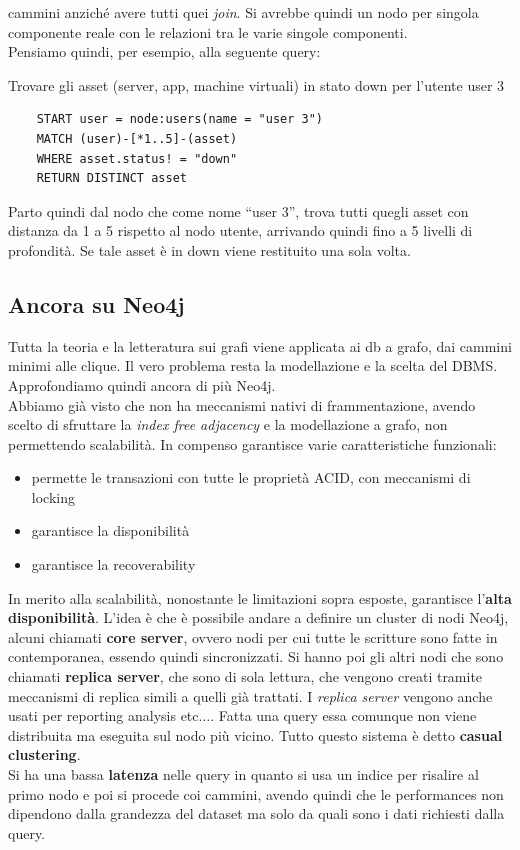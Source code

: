 \documentclass[a4paper,12pt, oneside]{book}
\begin{document}
\begin{esempio}
  cammini anziché avere tutti quei \textit{join}. Si avrebbe quindi un nodo per
  singola componente reale con le relazioni tra le varie singole componenti. \\
  Pensiamo quindi, per esempio, alla seguente query:
  \begin{center}
    Trovare gli asset (server, app, machine virtuali) in stato down per l’utente
    user 3
  \end{center}
  \begin{verbatim}
    START user = node:users(name = "user 3")
    MATCH (user)-[*1..5]-(asset)
    WHERE asset.status! = "down"
    RETURN DISTINCT asset
  \end{verbatim}
  Parto quindi dal nodo che come nome ``user 3'', trova tutti quegli asset con
  distanza da 1 a 5 rispetto al nodo utente, arrivando quindi fino a 5 livelli
  di profondità. Se tale asset è in down viene restituito una sola volta.
\end{esempio}
\subsection{Ancora su Neo4j}
Tutta la teoria e la letteratura sui grafi viene applicata ai db a grafo, dai
cammini minimi alle clique. Il vero problema resta la modellazione e la scelta
del DBMS. Approfondiamo quindi ancora di più Neo4j.\\
Abbiamo già visto che non ha meccanismi nativi di frammentazione, avendo scelto
di sfruttare la \textit{index free adjacency} e la modellazione a grafo, non
permettendo scalabilità. In compenso garantisce varie caratteristiche
funzionali:
\begin{itemize}
  \item permette le transazioni con tutte le proprietà ACID, con meccanismi di
  locking
  \item garantisce la disponibilità
  \item garantisce la recoverability
\end{itemize}
In merito alla scalabilità, nonostante le limitazioni sopra esposte,
garantisce l'\textbf{alta disponibilità}. L'idea è che è possibile andare a
definire un cluster di nodi Neo4j, alcuni chiamati \textbf{core server}, ovvero
nodi per cui tutte le scritture sono fatte in contemporanea, essendo quindi
sincronizzati. Si hanno poi gli altri nodi che sono chiamati \textbf{replica
  server}, che sono di sola lettura, che vengono creati tramite meccanismi di
replica simili a quelli già trattati. I \textit{replica server} vengono anche
usati per reporting analysis etc$\ldots$. Fatta una query essa comunque non
viene distribuita ma eseguita sul nodo più vicino. Tutto questo sistema è detto
\textbf{casual clustering}.\\
Si ha una bassa \textbf{latenza} nelle query in quanto si usa un indice per
risalire al primo nodo e poi si procede coi cammini, avendo quindi che le
performances non dipendono dalla grandezza del dataset ma solo da quali sono i
dati richiesti dalla query.
\end{document}

